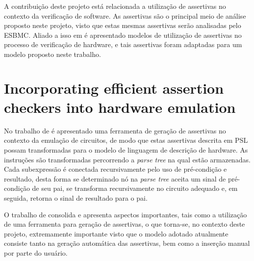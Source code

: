 \par
A contribuição deste projeto está relacionada a utilização de assertivas no contexto da verificação de software. As assertivas são o principal meio de análise proposto neste projeto, visto que estas mesmas assertivas serão analisadas pelo ESBMC. Aliado a isso em  é apresentado modelos de utilização de assertivas no processo de verificação de hardware, e tais assertivas foram adaptadas para um modelo proposto neste trabalho.

\section{Incorporating efficient assertion checkers into hardware emulation}
\par
No trabalho de  é apresentado uma ferramenta de geração de assertivas no contexto da emulação de circuitos, de modo que estas assertivas descrita em PSL possam transformadas para o modelo de linguagem de descrição de hardware. As instruções são transformadas percorrendo a \textit{parse tree} na qual estão armazenadas. Cada subexpressão é conectada recursivamente pelo uso de pré-condição e resultado, desta forma se determinado nó na \textit{parse tree} aceita um sinal de pré-condição de seu pai, se transforma recursivamente no circuito adequado e, em seguida, retorna o sinal de resultado para o pai.

\par
O trabalho de  consolida e apresenta aspectos importantes, tais como a utilização de uma ferramenta para geração de assertivas, o que torna-se, no contexto deste projeto, extremamente importante visto que o modelo adotado atualmente consiste tanto na geração automática das assertivas, bem como a inserção manual por parte do usuário.

